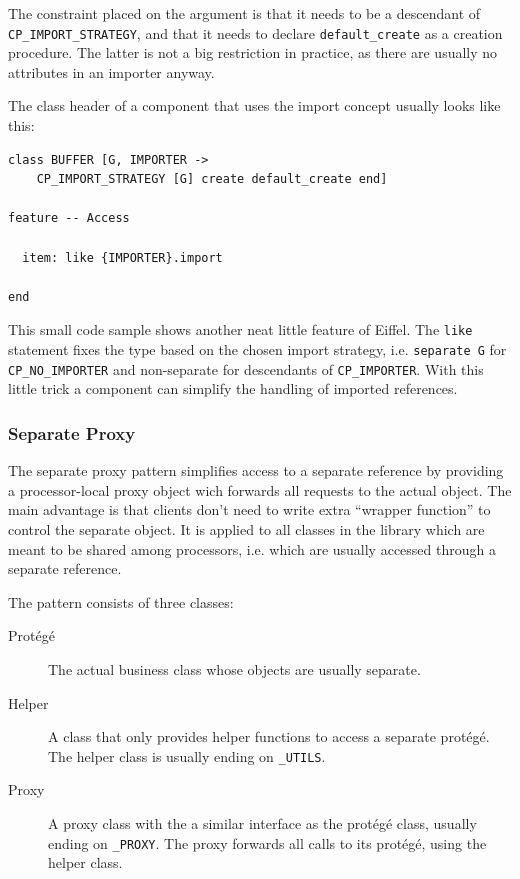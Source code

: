 \documentclass[a4paper,10pt]{article}
\begin{document}
The constraint placed on the argument is that it needs to be a descendant of \lstinline!CP_IMPORT_STRATEGY!, and that it needs to declare \lstinline!default_create! as a creation procedure.
The latter is not a big restriction in practice, as there are usually no attributes in an importer anyway.

The class header of a component that uses the import concept usually looks like this:
\begin{lstlisting}[language=OOSC2Eiffel, captionpos=b, caption={An example component with import.}]
class BUFFER [G, IMPORTER -> 
	CP_IMPORT_STRATEGY [G] create default_create end]

feature -- Access

  item: like {IMPORTER}.import

end
\end{lstlisting}

This small code sample shows another neat little feature of Eiffel.
The \lstinline!like! statement fixes the type based on the chosen import strategy, i.e. \lstinline!separate G! for \lstinline!CP_NO_IMPORTER! and non-separate for descendants of \lstinline!CP_IMPORTER!.
With this little trick a component can simplify the handling of imported references.

\subsubsection{Separate Proxy}

The separate proxy pattern simplifies access to a separate reference by providing a processor-local proxy object wich forwards all requests to the actual object.
The main advantage is that clients don't need to write extra ``wrapper function'' to control the separate object.
It is applied to all classes in the library which are meant to be shared among processors, i.e. which are usually accessed through a separate reference.

The pattern consists of three classes:
\begin{description}
 \item [Protégé] The actual business class whose objects are usually separate.
 \item [Helper] A class that only provides helper functions to access a separate protégé.
  The helper class is usually ending on \lstinline!_UTILS!.
 \item [Proxy] A proxy class with the a similar interface as the protégé class, usually ending on \lstinline!_PROXY!.
    The proxy forwards all calls to its protégé, using the helper class.
\end{description}
\end{document}
